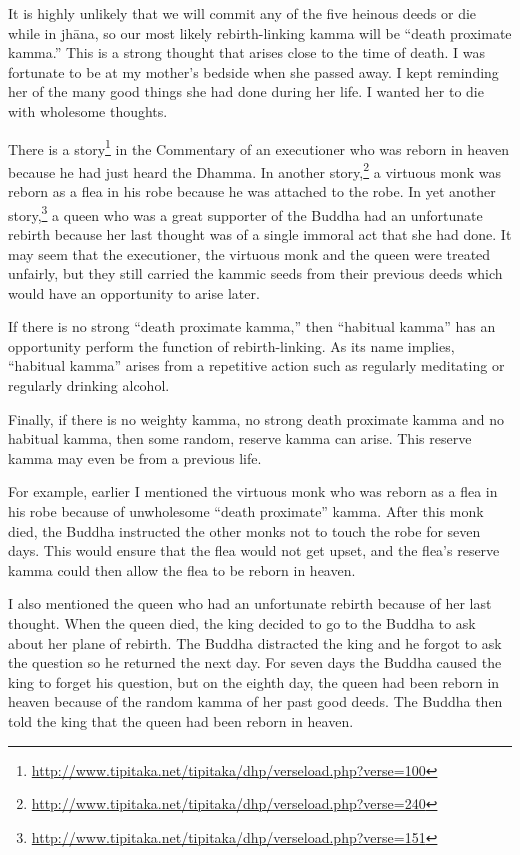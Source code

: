 It is highly unlikely that we will commit any of the five heinous deeds or die while in jhāna, so our most likely rebirth-linking kamma will be “death proximate kamma.” This is a strong thought that arises close to the time of death. I was fortunate to be at my mother’s bedside when she passed away. I kept reminding her of the many good things she had done during her life. I wanted her to die with wholesome thoughts. 

There is a story\footnote{\url{http://www.tipitaka.net/tipitaka/dhp/verseload.php?verse=100}} in the Commentary of an executioner who was reborn in heaven because he had just heard the Dhamma. In another story,\footnote{\url{http://www.tipitaka.net/tipitaka/dhp/verseload.php?verse=240}} a virtuous monk was reborn as a flea in his robe because he was attached to the robe. In yet another story,\footnote{\url{http://www.tipitaka.net/tipitaka/dhp/verseload.php?verse=151}} a queen who was a great supporter of the Buddha had an unfortunate rebirth because her last thought was of a single immoral act that she had done. It may seem that the executioner, the virtuous monk and the queen were treated unfairly, but they still carried the kammic seeds from their previous deeds which would have an opportunity to arise later.

If there is no strong “death proximate kamma,” then “habitual kamma” has an opportunity perform the function of rebirth-linking. As its name implies, “habitual kamma” arises from a repetitive action such as regularly meditating or regularly drinking alcohol.

Finally, if there is no weighty kamma, no strong death proximate kamma and no habitual kamma, then some random, reserve kamma can arise. This reserve kamma may even be from a previous life. 

For example, earlier I mentioned the virtuous monk who was reborn as a flea in his robe because of unwholesome “death proximate” kamma. After this monk died, the Buddha instructed the other monks not to touch the robe for seven days. This would ensure that the flea would not get upset, and the flea’s reserve kamma could then allow the flea to be reborn in heaven. 

I also mentioned the queen who had an unfortunate rebirth because of her last thought. When the queen died, the king decided to go to the Buddha to ask about her plane of rebirth. The Buddha distracted the king and he forgot to ask the question so he returned the next day. For seven days the Buddha caused the king to forget his question, but on the eighth day, the queen had been reborn in heaven because of the random kamma of her past good deeds. The Buddha then told the king that the queen had been reborn in heaven.

